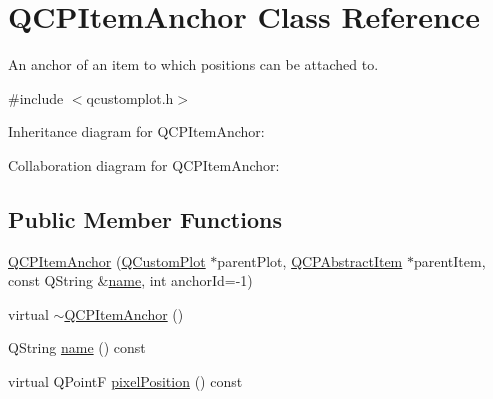 \hypertarget{class_q_c_p_item_anchor}{}\section{Q\+C\+P\+Item\+Anchor Class Reference}
\label{class_q_c_p_item_anchor}


An anchor of an item to which positions can be attached to.  




{\ttfamily \#include $<$qcustomplot.\+h$>$}



Inheritance diagram for Q\+C\+P\+Item\+Anchor\+:


Collaboration diagram for Q\+C\+P\+Item\+Anchor\+:
\subsection*{Public Member Functions}
\begin{DoxyCompactItemize}
\item 
\hyperlink{class_q_c_p_item_anchor_a32573023c6fa65b4496f1f995e5bfa5f}{Q\+C\+P\+Item\+Anchor} (\hyperlink{class_q_custom_plot}{Q\+Custom\+Plot} $\ast$parent\+Plot, \hyperlink{class_q_c_p_abstract_item}{Q\+C\+P\+Abstract\+Item} $\ast$parent\+Item, const Q\+String \&\hyperlink{class_q_c_p_item_anchor_aad37cdf5a3f63428f61be739014e212e}{name}, int anchor\+Id=-\/1)
\item 
virtual \hyperlink{class_q_c_p_item_anchor_a1868559407600688ee4d1a4621e81ceb}{$\sim$\+Q\+C\+P\+Item\+Anchor} ()
\item 
Q\+String \hyperlink{class_q_c_p_item_anchor_aad37cdf5a3f63428f61be739014e212e}{name} () const
\item 
virtual Q\+PointF \hyperlink{class_q_c_p_item_anchor_a06dcfb7220d26eee93eef56ae66582cb}{pixel\+Position} () const
\end{DoxyCompactItemize}
